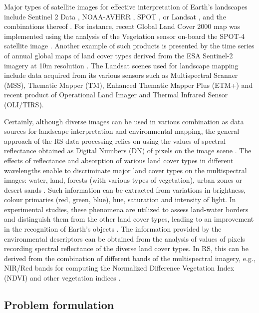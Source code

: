 \documentclass[earth,article,submit,pdftex,moreauthors]{Definitions/mdpi}
\begin{document}
Major types of satellite images for effective interpretation of Earth's landscapes include Sentinel 2 Data \cite{Ngom,TONG2020111598}, NOAA-AVHRR \cite{KONARSKA2002491,ANYAMBA2005596,Frederiksen}, SPOT \cite{SILVA2005188,MARTINEZ2011152}, or Landsat \cite{PIMPLE2020118007,Lemenkova202315}, and the combinations thereof \cite{rs12193157}. For instance, recent Global Land Cover 2000 map was {implemented using }the analysis of the Vegetation sensor on-board the SPOT-4 satellite {image }\cite{Mayaux}. {Another example of such products is presented by the time series of annual global maps of land cover types derived from {the }ESA Sentinel-2 imagery at 10m resolution }\cite{Karraetal}. {The }Landsat scenes used for landscape mapping include{ }data acquired from {its }various{ }sensors such as Multispectral Scanner (MSS), Thematic Mapper (TM), Enhanced Thematic Mapper Plus (ETM+) and recent product of Operational Land Imager and Thermal Infrared Sensor (OLI/TIRS).

Certainly, although diverse images can be used in various combination as data sources for landscape interpretation and environmental mapping, the general approach of {the RS} data processing relies on using {the values of} spectral reflectance obtained as {Digital Numbers (DN)} of pixels on the image scene \cite{ACKER2014}. The effects of reflectance and absorption of various land cover types in different wavelengths{ }{enable }to discriminate major land cover types on the multispectral images: water, land, forests (with various types of vegetation), urban zones {or} desert sands \cite{rs12101634}. {Such information can be extracted from} variations in brightness, colour primaries (red, green, blue), hue, saturation and intensity of light{. In experimental studies, these phenomena {are} utilized to assess land-water borders and distinguish them from {the }other land cover types, leading to an improvement in the recognition of Earth's objects} \cite{rs13132454}. {The} information{ }provided by the environmental descriptors{ }can be obtained from the analysis of values of pixels recording spectral reflectance of {the} diverse land cover types{. In {RS}, this can be} derived from the combination of different bands {of the} multispectral imagery, e.g., NIR/Red bands for computing the Normalized Difference Vegetation Index (NDVI) and other vegetation indices \cite{CRIPPEN199071,LI2004463,jmse11040871,RUAN2022157075}.

\subsection{Problem formulation}
\end{document}
